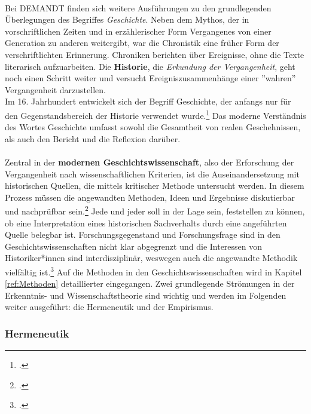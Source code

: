 \documentclass[12pt,a4paper]{article}
\begin{document}
\\
Bei DEMANDT finden sich weitere Ausführungen zu den grundlegenden Überlegungen des Begriffes \textit{Geschichte}. Neben dem Mythos, der in vorschriftlichen Zeiten und in erzählerischer Form Vergangenes von einer Generation zu anderen weitergibt, war die Chronistik eine früher Form der verschriftlichten Erinnerung. Chroniken berichten über Ereignisse, ohne die Texte literarisch aufzuarbeiten. Die \textbf{Historie}, die \textit{Erkundung der Vergangenheit}, geht noch einen Schritt weiter und versucht Ereigniszusammenhänge einer ''wahren'' Vergangenheit darzustellen. 
\\
Im 16. Jahrhundert entwickelt sich der Begriff Geschichte, der anfangs nur für den Gegenstandsbereich der Historie verwendet wurde.\footcite[][S.57-58]{schulz2010neuere} Das moderne Verständnis des Wortes Geschichte umfasst sowohl die Gesamtheit von realen Geschehnissen, als auch den Bericht und die Reflexion darüber.
\\
\\
Zentral in der \textbf{modernen Geschichtswissenschaft}, also der Erforschung der Vergangenheit nach wissenschaftlichen Kriterien, ist die Auseinandersetzung mit historischen Quellen, die mittels kritischer Methode untersucht werden. In diesem Prozess müssen die angewandten Methoden, Ideen und Ergebnisse diskutierbar und nachprüfbar sein.\footcite[][S.13-32]{demand2011philosophie} Jede und jeder soll in der Lage sein, feststellen zu können, ob eine Interpretation eines historischen Sachverhalts durch eine angeführten Quelle belegbar ist. Forschungsgegenstand und Forschungsfrage sind in den Geschichtswissenschaften nicht klar abgegrenzt und die Interessen von Historiker*innen sind interdisziplinär, weswegen auch die angewandte Methodik vielfältig ist.\footcite[][S.13]{reiche2014verfahren} Auf die Methoden in den Geschichtswissenschaften wird in Kapitel \ref{ref:Methoden} detaillierter eingegangen.
Zwei grundlegende Strömungen in der Erkenntnis- und Wissenschaftstheorie sind wichtig und werden im Folgenden weiter ausgeführt: die Hermeneutik und der Empirismus.


\subsubsection{Hermeneutik}
\end{document}
